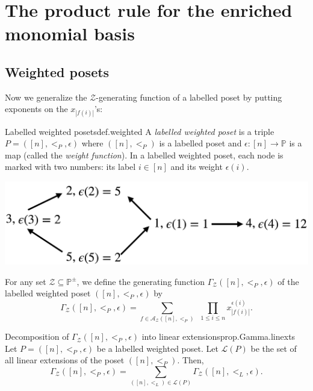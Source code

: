 \documentclass[numbers=enddot,12pt,final,onecolumn,notitlepage]{scrartcl}%
\newcommand{\PP}{\mathbb{P}} %
\newcommand{\calZ}{\mathcal{Z}}
\newcommand{\calA}{\mathcal{A}}
\newcommand{\calL}{\mathcal{L}}
\newcommand{\tup}[1]{\left( #1 \right)}
\newcommand{\defn}[1]{{\color{darkred}\emph{#1}}}
\newcommand{\0}{\phantom{c}}
\let\sumnonlimits\sum
\let\prodnonlimits\prod
\renewcommand{\sum}{\sumnonlimits\limits}
\renewcommand{\prod}{\prodnonlimits\limits}
\begin{document}
\section{The product rule for the enriched monomial basis}
\subsection{Weighted posets}

Now we generalize the $\calZ$-generating function of a labelled poset by putting exponents on the $x_{|f(i)|}$'s:

\begin{definition}{Labelled weighted posets}{def.weighted}
A \defn{labelled weighted poset} is a triple $P = ([n], <_P, \epsilon)$ where $([n], <_P)$ is a labelled poset and $\epsilon : [n] \longrightarrow \PP$ is a map (called the \defn{weight function}).
In a labelled weighted poset, each node is marked with two numbers: its label $i \in [n]$ and its weight $\epsilon(i)$.
%
\begin{center}
 \includegraphics[scale=0.16]{Poset.png}
 \label{fig : poset}
 \end{center}
 For any set $\mathcal{Z}\subseteq \PP^{\pm}$, we define the generating function \defn{$\Gamma_\mathcal{Z}([n], <_P, \epsilon)$} of the labelled weighted poset $([n], <_P, \epsilon)$ by
\begin{equation}
\label{eq : weightGamma}
\Gamma_\mathcal{Z}([n], <_P, \epsilon) = \sum_{f \in \calA_\mathcal{Z}([n], <_P)}\ \ \prod_{1\leq i \leq n}x_{|f(i)|}^{\epsilon(i)} .
\end{equation} 
 \end{definition}

\begin{proposition}{Decomposition of $\Gamma_\mathcal{Z}([n], <_P, \epsilon)$ into linear extensions}{prop.Gamma.linexts}
Let $P = ([n], <_P, \epsilon)$ be a labelled weighted poset.
Let $\calL\tup{P}$ be the set of all linear extensions of the poset $([n], <_P)$. Then,
\begin{equation}
\Gamma_\mathcal{Z}([n], <_P, \epsilon)
= \sum_{([n], <_L) \in \calL\tup{P}} \Gamma_\mathcal{Z}([n], <_L, \epsilon) .
\label{eq.prop.Gamma.linexts.eq}
\end{equation}
\end{proposition}
 
\end{document}
